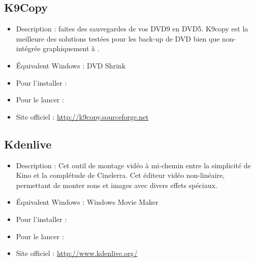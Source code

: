 \subsection{K9Copy}
\begin{itemize}
\begingroup
{}
\item Description : faites des sauvegardes de vos DVD9 en DVD5. K9copy est la meilleure des solutions testées pour les back-up de DVD bien que non-intégrée graphiquement à .{\par}
\item Équivalent Windows : DVD Shrink{\par}
\item Pour l'installer : 
\item Pour le lancer : 
\item Site officiel : \url{http://k9copy.sourceforge.net}{\par}
\endgroup
\end{itemize}
\subsection{Kdenlive}
\begin{itemize}
\begingroup
{}
\item Description : Cet outil de montage vidéo à mi-chemin entre la simplicité de Kino et la complétude de Cinelerra. Cet éditeur vidéo non-linéaire, permettant de monter sons et images avec divers effets spéciaux.{\par}
\endgroup
\item Équivalent Windows : Windows Movie Maker{\par}
\item Pour l'installer : 
\item Pour le lancer : 
\item Site officiel : \url{http://www.kdenlive.org/}{\par}
\end{itemize}

